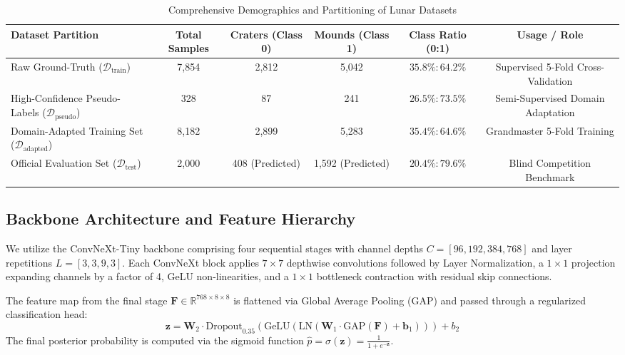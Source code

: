 \documentclass[10pt,journal,compsoc]{IEEEtran}
\theoremstyle{definition}
\begin{document}
\begin{table}[t]
\centering
\caption{Comprehensive Demographics and Partitioning of Lunar Datasets}
\label{tab:dataset}
\begin{tabular}{lccccc}
\toprule
\textbf{Dataset Partition} & \textbf{Total Samples} & \textbf{Craters (Class 0)} & \textbf{Mounds (Class 1)} & \textbf{Class Ratio (0:1)} & \textbf{Usage / Role} \\
\midrule
Raw Ground-Truth ($\mathcal{D}_{\text{train}}$) & 7,854 & 2,812 & 5,042 & $35.8\% : 64.2\%$ & Supervised 5-Fold Cross-Validation \\
High-Confidence Pseudo-Labels ($\mathcal{D}_{\text{pseudo}}$) & 328 & 87 & 241 & $26.5\% : 73.5\%$ & Semi-Supervised Domain Adaptation \\
Domain-Adapted Training Set ($\mathcal{D}_{\text{adapted}}$) & 8,182 & 2,899 & 5,283 & $35.4\% : 64.6\%$ & Grandmaster 5-Fold Training \\
Official Evaluation Set ($\mathcal{D}_{\text{test}}$) & 2,000 & 408 (Predicted) & 1,592 (Predicted) & $20.4\% : 79.6\%$ & Blind Competition Benchmark \\
\bottomrule
\end{tabular}
\end{table}

\subsection{Backbone Architecture and Feature Hierarchy}
We utilize the ConvNeXt-Tiny backbone comprising four sequential stages with channel depths $C = [96, 192, 384, 768]$ and layer repetitions $L = [3, 3, 9, 3]$. Each ConvNeXt block applies $7\times7$ depthwise convolutions followed by Layer Normalization, a $1\times1$ projection expanding channels by a factor of 4, GeLU non-linearities, and a $1\times1$ bottleneck contraction with residual skip connections.

The feature map from the final stage $\mathbf{F} \in \mathbb{R}^{768 \times 8 \times 8}$ is flattened via Global Average Pooling ($\text{GAP}$) and passed through a regularized classification head:
\begin{equation}
\mathbf{z} = \mathbf{W}_2 \cdot \text{Dropout}_{0.35}\left(\text{GeLU}\left(\text{LN}(\mathbf{W}_1 \cdot \text{GAP}(\mathbf{F}) + \mathbf{b}_1)\right)\right) + b_2
\end{equation}
The final posterior probability is computed via the sigmoid function $\hat{p} = \sigma(\mathbf{z}) = \frac{1}{1 + e^{-\mathbf{z}}}$.
\end{document}
